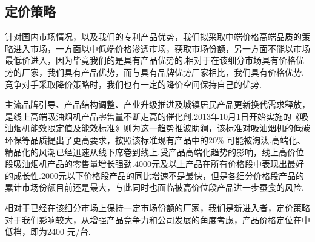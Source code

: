 \subsection{定价策略}
针对国内市场情况，以及我们的专利产品优势，我们拟采取中端价格高端品质的策略进入市场，一方面以中低端价格渗透市场，获取市场份额，另一方面不能以市场最低价进入，因为毕竟我们的是具有产品优势的.相对于在该细分市场具有价格优势的厂家，我们具有产品优势，而与具有品牌优势厂家相比，我们具有价格优势.竞争对手采取降价策略时，我们也有一定的降价空间保持自己的优势.

主流品牌引导、产品结构调整、产业升级推进及城镇居民产品更新换代需求释放，是线上高端吸油烟机产品零售量不断走高的催化剂.2013年10月1日开始实施的《吸油烟机能效限定值及能效标准》则为这一趋势推波助澜，该标准对吸油烟机的低碳环保等品质提出了更高要求，按照该标准现有产品中的20\% 可能被淘汰.高端化、精品化的风潮已经迅速从线下席卷到线上.受产品高端化趋势的影响，线上高价位段吸油烟机产品的零售量增长强劲.4000元及以上产品在所有价格段中表现出最好的成长性.2000元以下价格段产品的同比增速不是最快，但是各细分价格段产品的累计市场份额目前还是最大，与此同时也面临被高价位段产品进一步蚕食的风险.

相对于已经在该细分市场上保持一定市场份额的厂家，我们是新进入者，定价策略对于我们影响较大，从增强产品竞争力和公司发展的角度考虑，产品价格定位在中低档，即为2400 元/台.


